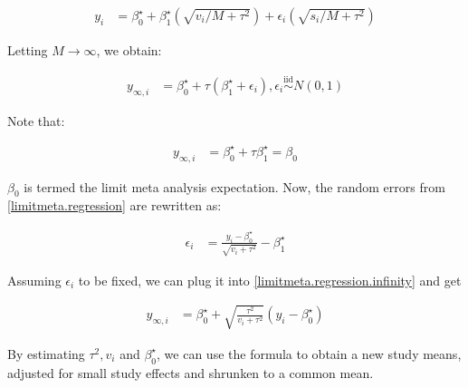 \documentclass[11pt,a4paper,twoside]{book}\usepackage[]{graphicx}\usepackage[]{color}
\begin{document}
\begin{align}
y_{i} &= \beta_{0}^\star + \beta_{1}^\star(\sqrt{v_{i}/M + \tau^2}) + \epsilon_{i}(\sqrt{s_{i}/M + \tau^2}) \label{limitmeta.regression}
\end{align}

Letting $M \rightarrow \infty$, we obtain:

\begin{align}
y_{\infty,i} &= \beta_{0}^\star + \tau(\beta_{1}^\star + \epsilon_{i}),  \epsilon_{i} \stackrel{\textrm{iid}}{\sim} N(0,1) \label{limitmeta.regression.infinity}
\end{align}

Note that:

\begin{align}
y_{\infty,i} &= \beta_{0}^\star + \tau\beta_{1}^\star = \beta_{0}
\end{align}

$\beta_{0}$ is termed the limit meta analysis expectation. Now, the random errors from \ref{limitmeta.regression} are rewritten as:

\begin{align}
\epsilon_{i} &= \frac{y_{i} - \beta_{0}^\star}{\sqrt{v_{i} + \tau^2}} - \beta_{1}^\star
\end{align}

Assuming $\epsilon_{i}$ to be fixed, we can plug it into \ref{limitmeta.regression.infinity} and get 

\begin{align}
y_{\infty,i} &= \beta_{0}^\star + \sqrt{\frac{\tau^2}{v_{i} + \tau^2}}(y_{i} - \beta_{0}^\star)
\end{align}

By estimating $\tau^2, v_{i}$ and  $\beta_{0}^\star$, we can use the formula to obtain a new study means, adjusted for small study effects and shrunken to a common mean. 







% 
% 
% 
% 
% 
% 
\end{document}
